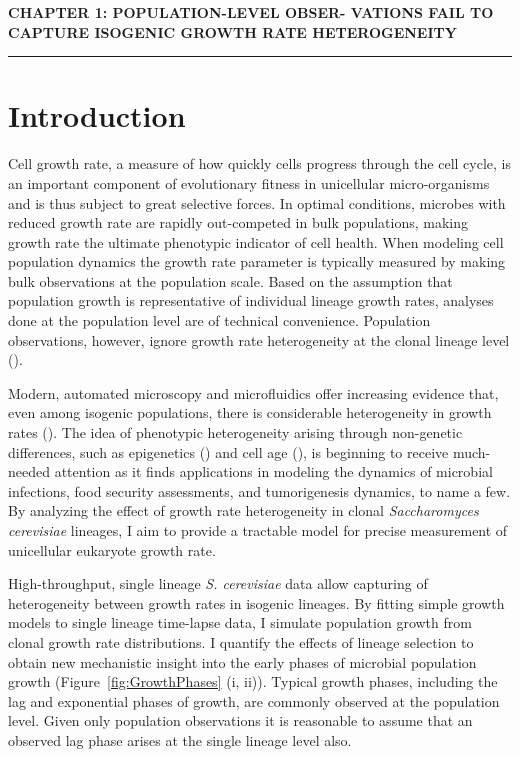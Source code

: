 \documentclass{bioinfo}
\begin{document}
\vspace{+10em}

\textbf{\large{CHAPTER 1: POPULATION-LEVEL OBSER- VATIONS FAIL TO CAPTURE ISOGENIC GROWTH RATE HETEROGENEITY}}\\
\noindent\rule[0.5ex]{\linewidth}{1pt}
\vspace{-5em}
\section{Introduction}

Cell growth rate, a measure of how quickly cells progress through the cell cycle, is an important component of evolutionary fitness in unicellular micro-organisms and is thus subject to great selective forces. In optimal conditions, microbes with reduced growth rate are rapidly out-competed in bulk populations, making growth rate the ultimate phenotypic indicator of cell health. When modeling cell population dynamics the growth rate parameter is typically measured by making bulk observations at the population scale. Based on the assumption that population growth is representative of individual lineage growth rates, analyses done at the population level are of technical convenience. Population observations, however, ignore growth rate heterogeneity at the clonal lineage level (\citealp{Dijk15,Kiviet14}). 

Modern, automated microscopy and microfluidics offer increasing evidence that, even among isogenic populations, there is considerable heterogeneity in growth rates (\citealp{Pin06,Schmidt12,Levy12}). The idea of phenotypic heterogeneity arising through non-genetic differences, such as epigenetics (\citealp{Bird07}) and cell age (\citealp{Ginovart11}), is beginning to receive much-needed attention as it finds applications in modeling the dynamics of microbial infections, food security assessments, and tumorigenesis dynamics, to name a few. By analyzing the effect of growth rate heterogeneity in clonal \textit{Saccharomyces cerevisiae} lineages, I aim to provide a tractable model for precise measurement of unicellular eukaryote growth rate.

High-throughput, single lineage \textit{S. cerevisiae} data allow capturing of heterogeneity between growth rates in isogenic lineages. By fitting simple growth models to single lineage time-lapse data, I simulate population growth from clonal growth rate distributions. I quantify the effects of lineage selection to obtain new mechanistic insight into the early phases of microbial population growth (Figure~\ref{fig:GrowthPhases} (i, ii)). Typical growth phases, including the lag and exponential phases of growth, are commonly observed at the population level. Given only population observations it is reasonable to assume that an observed lag phase arises at the single lineage level also.
\end{document}
